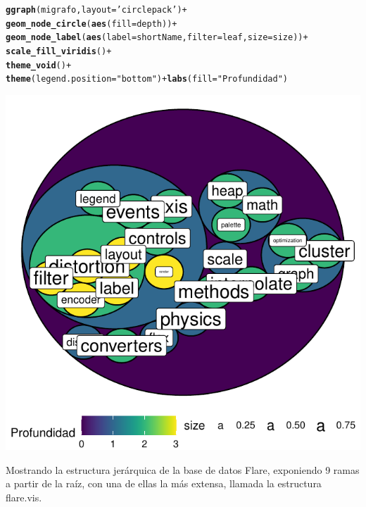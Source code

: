 \documentclass{article}\usepackage[]{graphicx}\usepackage[]{color}
\makeatletter
\def\maxwidth{ %
  \ifdim\Gin@nat@width>\linewidth
    \linewidth
  \else
    \Gin@nat@width
  \fi
}
\newcommand{\hlstr}[1]{\textcolor[rgb]{0.192,0.494,0.8}{#1}}%
\newcommand{\hlopt}[1]{\textcolor[rgb]{0,0,0}{#1}}%
\newcommand{\hlstd}[1]{\textcolor[rgb]{0.345,0.345,0.345}{#1}}%
\newcommand{\hlkwc}[1]{\textcolor[rgb]{0.333,0.667,0.333}{#1}}%
\newcommand{\hlkwd}[1]{\textcolor[rgb]{0.737,0.353,0.396}{\textbf{#1}}}%
\newenvironment{kframe}{%
 \def\at@end@of@kframe{}%
 \ifinner\ifhmode%
  \def\at@end@of@kframe{\end{minipage}}%
  \begin{minipage}{\columnwidth}%
 \fi\fi%
 \def\FrameCommand##1{\hskip\@totalleftmargin \hskip-\fboxsep
 \colorbox{shadecolor}{##1}\hskip-\fboxsep
     \hskip-\linewidth \hskip-\@totalleftmargin \hskip\columnwidth}%
 \MakeFramed {\advance\hsize-\width
   \@totalleftmargin\z@ \linewidth\hsize
   \@setminipage}}%
 {\par\unskip\endMakeFramed%
 \at@end@of@kframe}
\newenvironment{knitrout}{}{} %
\makeatother
\begin{document}
\begin{knitrout}
\color{fgcolor}\begin{kframe}
\begin{alltt}
\hlkwd{ggraph}\hlstd{(migrafo,} \hlkwc{layout} \hlstd{=} \hlstr{'circlepack'}\hlstd{)} \hlopt{+}
  \hlkwd{geom_node_circle}\hlstd{(}\hlkwd{aes}\hlstd{(}\hlkwc{fill} \hlstd{= depth))} \hlopt{+}
  \hlkwd{geom_node_label}\hlstd{(}\hlkwd{aes}\hlstd{(}\hlkwc{label} \hlstd{= shortName,} \hlkwc{filter} \hlstd{= leaf,} \hlkwc{size} \hlstd{= size))} \hlopt{+}
  \hlkwd{scale_fill_viridis}\hlstd{()} \hlopt{+}
  \hlkwd{theme_void}\hlstd{()} \hlopt{+}
  \hlkwd{theme}\hlstd{(}\hlkwc{legend.position} \hlstd{=} \hlstr{"bottom"}\hlstd{)} \hlopt{+} \hlkwd{labs}\hlstd{(}\hlkwc{fill} \hlstd{=} \hlstr{"Profundidad"}\hlstd{)}
\end{alltt}
\end{kframe}

{\centering \includegraphics[width=\maxwidth]{figure/plot_ggraph-1-1} 

}



\end{knitrout}
Mostrando la estructura jer\'arquica de la base de datos Flare, exponiendo 9 ramas a partir de la ra\'iz, con una de ellas la m\'as extensa, llamada la estructura flare.vis.
\clearpage
\end{document}
